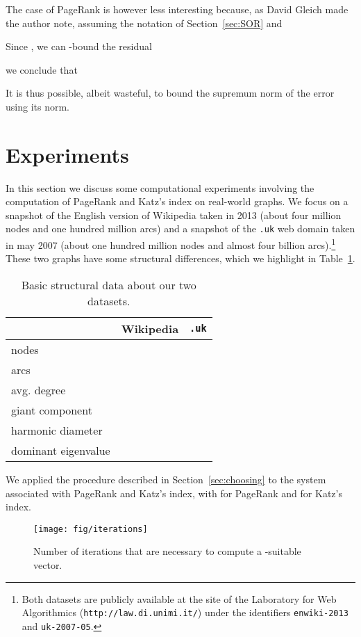 \documentclass{article}
\newcommand{\1}{\mathbf 1}
\begin{document}
The case of PageRank is however less interesting because, as David Gleich made
the author note, assuming the notation of Section~\ref{sec:SOR} and 

Since , we can -bound the residual

we conclude that

It is thus possible, albeit wasteful, to bound the supremum norm of the error
using its  norm.

\section{Experiments}

In this section we discuss some computational experiments involving the computation of PageRank
and Katz's index on real-world graphs. We focus on a snapshot of the English version of Wikipedia taken in 2013
(about four million nodes and one hundred million arcs) and a snapshot of the \texttt{.uk} web domain
taken in may 2007 (about one hundred million nodes and almost four billion arcs).\footnote{Both datasets are
publicly available at the site of the Laboratory for Web Algorithmics (\texttt{http://law.di.unimi.it/}) under the identifiers
\texttt{enwiki-2013} and \texttt{uk-2007-05}.} These two graphs have some structural differences, which we highlight
in Table~\ref{tab:datasets}.

\begin{table}
\centering
\begin{tabular}{l|rr}
& \multicolumn{1}{c}{Wikipedia} & \multicolumn{1}{c}{\texttt{.uk}}\\
\hline
nodes &  &  \\
arcs &  & \\
avg. degree &  & \\
giant component &  &  \\
harmonic diameter &  & \\
dominant eigenvalue &  &  \\  
\end{tabular}
\caption{\label{tab:datasets}Basic structural data about our two datasets.}
\end{table}

We applied the procedure described in Section~\ref{sec:choosing} to the system associated with PageRank
and Katz's index, with  for PageRank and
 for Katz's index.

\begin{figure}
\centering
\texttt{[image: fig/iterations]}
\caption{\label{fig:iter}Number of iterations that are necessary to compute a -suitable vector.}
\end{figure}
\end{document}
